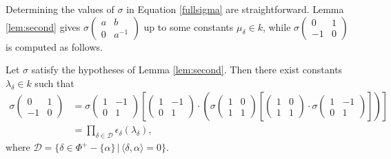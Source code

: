 Determining the values of $\sigma$ in Equation \ref{fullsigma} are straightforward. Lemma \ref{lem:second} gives $\sigma\left(\begin{matrix}a & b \\ 0 & a^{-1}\end{matrix}\right)$ up to some constants $\mu_\delta\in k$, while $\sigma\left(\begin{matrix}0 & 1\\-1 & 0\end{matrix}\right)$ is computed as follows.
\begin{proposition} \label{prop:A}
Let $\sigma$ satisfy the hypotheses of Lemma \ref{lem:second}. Then there exist constants $\lambda_\delta\in k$ such that
\begin{align}
	\sigma\left(\begin{matrix}0 & 1 \\ -1 & 0\end{matrix}\right) &=
	\sigma
		\left(\begin{matrix} 1 & -1\\ 0 & 1\end{matrix}\right)
	\left[
		\left(\begin{matrix} 1 & -1\\ 0 & 1\end{matrix}\right)\cdot
		\left(
		\sigma
		\left(\begin{matrix} 1 & 0\\ 1 & 1\end{matrix}\right)
		\left[
		\left(\begin{matrix} 1 & 0\\ 1 & 1\end{matrix}\right)\cdot
		\sigma\left(\begin{matrix} 1 & -1\\ 0 & 1\end{matrix}\right)\right]
		\right)
	\right] \label{prop:A:eqn1}\\
	&= \prod_{\delta\in\mathcal{D}} \epsilon_\delta(\lambda_\delta),\label{prop:A:eqn2}
\end{align}
where $\mathcal{D} = \{\delta\in \Phi^+-\{\alpha\}\,|\,\langle\delta,\alpha\rangle = 0\}$.
\end{proposition}
